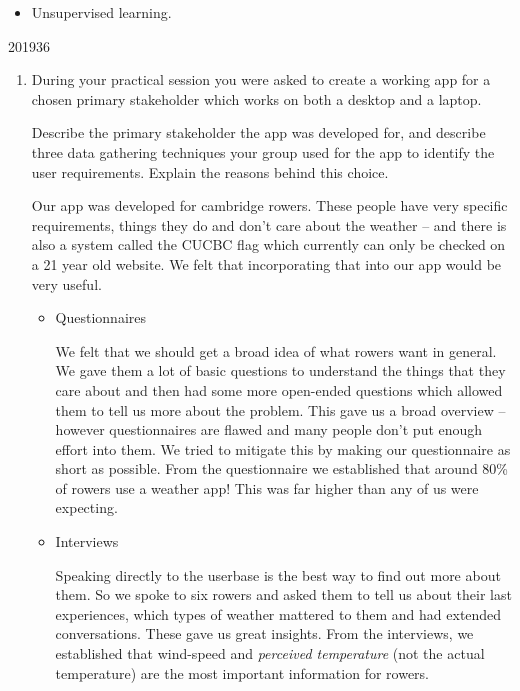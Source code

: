 \documentclass[10pt,\jkfside,a4paper]{article}
\begin{document}
\begin{itemize}

\item Unsupervised learning.

\end{itemize}

\begin{examquestion}{2019}{3}{6}

\begin{enumerate}[label=(\alph*)]

\item During your practical session you were asked to create a working app for a chosen
primary stakeholder which works on both a desktop and a laptop.

Describe the primary stakeholder the app was developed for, and describe three
data gathering techniques your group used for the app to identify the user
requirements. Explain the reasons behind this choice.

Our app was developed for cambridge rowers. These people have very specific
requirements, things they do and don't care about the weather -- and there is also
a system called the CUCBC flag which currently can only be checked on a 21 year old website.
We felt that incorporating that into our app would be very useful.

\begin{itemize}

\item Questionnaires

We felt that we should get a broad idea of what rowers want in general. We
gave them a lot of basic questions to understand the things that they care about
and then had some more open-ended questions which allowed them to tell us more
about the problem. This gave us a broad overview -- however questionnaires are
flawed and many people don't put enough effort into them. We tried to mitigate this
by making our questionnaire as short as possible. From the questionnaire we
established that around 80\% of rowers use a weather app! This was far higher than
any of us were expecting.

\item Interviews

Speaking directly to the userbase is the best way to find out more about them.
So we spoke to six rowers and asked them to tell us about their last experiences,
which types of weather mattered to them and had extended conversations. These
gave us great insights. From the interviews, we established that wind-speed and
\textit{perceived temperature} (not the actual temperature) are the most important
information for rowers.


\end{itemize}
\end{enumerate}
\end{examquestion}
\end{document}
